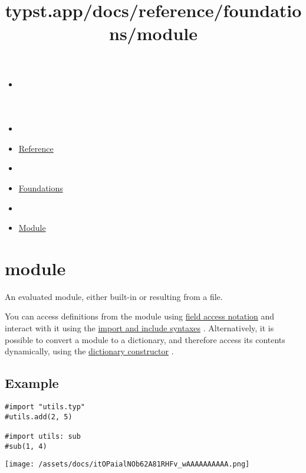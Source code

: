 \title{typst.app/docs/reference/foundations/module}

\begin{itemize}
\tightlist
\item
  \href{/docs}{}
\item
  
\item
  \href{/docs/reference/}{Reference}
\item
  
\item
  \href{/docs/reference/foundations/}{Foundations}
\item
  
\item
  \href{/docs/reference/foundations/module/}{Module}
\end{itemize}

\section{\texorpdfstring{{ module }}{ module }}\label{summary}

An evaluated module, either built-in or resulting from a file.

You can access definitions from the module using
\href{/docs/reference/scripting/\#fields}{field access notation} and
interact with it using the
\href{/docs/reference/scripting/\#modules}{import and include syntaxes}
. Alternatively, it is possible to convert a module to a dictionary, and
therefore access its contents dynamically, using the
\href{/docs/reference/foundations/dictionary/\#constructor}{dictionary
constructor} .

\subsection{Example}\label{example}

\begin{verbatim}
#import "utils.typ"
#utils.add(2, 5)

#import utils: sub
#sub(1, 4)
\end{verbatim}

\texttt{[image: /assets/docs/itOPaialNOb62A81RHFv\_wAAAAAAAAAA.png]}

\href{/docs/reference/foundations/label/}{\pandocbounded{}}

